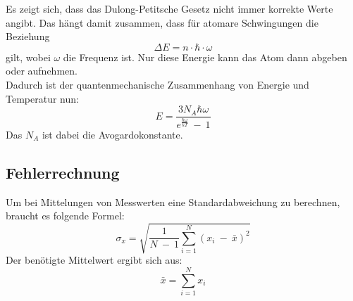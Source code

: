 Es zeigt sich, dass das Dulong-Petitsche Gesetz nicht immer korrekte Werte angibt.
Das hängt damit zusammen, dass für atomare Schwingungen die Beziehung
\begin{equation}
    \Delta E = n\cdot \hbar \cdot \omega
\end{equation}
gilt, wobei $\omega$ die Frequenz ist. Nur diese Energie kann das Atom dann abgeben oder aufnehmen.\\
Dadurch ist der quantenmechanische Zusammenhang von Energie und Temperatur nun:
\begin{equation}
    E = \frac{3N_A\hbar \omega}{e^{\frac{\hbar \omega}{kT}}\ -\ 1}
\end{equation}
Das $N_A$ ist dabei die Avogardokonstante.
\subsection{Fehlerrechnung}
Um bei Mittelungen von Messwerten eine Standardabweichung zu berechnen, braucht es folgende Formel:
\begin{equation}
    \sigma_x = \sqrt{\frac{1}{N\ -\ 1}\sum_{i=1}^N(x_i\ -\ \bar{x})^2}
    \label{eq:std}
\end{equation}
Der benötigte Mittelwert ergibt sich aus:
\begin{equation}
    \bar{x} = \sum_{i=1}^N x_i
\end{equation}
